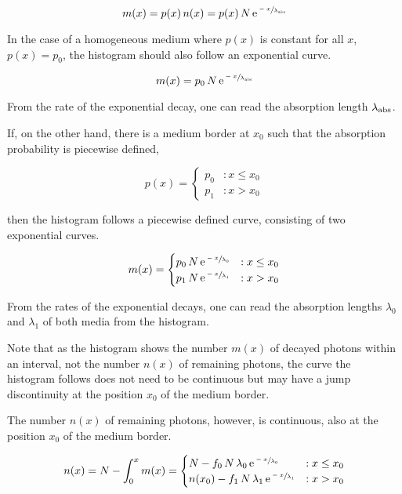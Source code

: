\[
  m(x) = p(x)\,n(x) = p(x)\,N\,\mathrm{e}^{\sfrac{-x}{\lambda_\text{abs}}}
\]

In the case of a homogeneous medium where \(p(x)\) is constant for all
\(x\), \(p(x) = p_0\), the histogram should also follow an exponential
curve.

\[
  m(x) = p_0\,N\,\mathrm{e}^{\sfrac{-x}{\lambda_\text{abs}}}
\]

From the rate of the exponential decay, one can read the absorption
length \(\lambda_\text{abs}\).

If, on the other hand, there is a medium border at \(x_0\) such that the
absorption probability is piecewise defined,

\[
  p(x) = \begin{cases}
    p_0 & : x \leq x_0 \\
    p_1 & : x > x_0
  \end{cases}
\]

then the histogram follows a piecewise defined curve, consisting of two
exponential curves.

\[
  m(x) = \begin{cases}
    p_0\,N\,\mathrm{e}^{\sfrac{-x}{\lambda_0}} & : x \leq x_0 \\
    p_1\,N\,\mathrm{e}^{\sfrac{-x}{\lambda_1}} & : x > x_0
  \end{cases}
\]

From the rates of the exponential decays, one can read the absorption
lengths \(\lambda_0\) and \(\lambda_1\) of both media from the
histogram.

Note that as the histogram shows the number \(m(x)\) of decayed photons
within an interval, not the number \(n(x)\) of remaining photons, the
curve the histogram follows does not need to be continuous but may have
a jump discontinuity at the position \(x_0\) of the medium border.

The number \(n(x)\) of remaining photons, however, is continuous, also
at the position \(x_0\) of the medium border.

\[
  n(x) = N - \int_0^x m(x) = \begin{cases}
    N - f_0\,N\,\lambda_0\,\mathrm{e}^{\sfrac{-x}{\lambda_0}} & : x \leq x_0 \\
    n(x_0) - f_1\,N\,\lambda_1\,\mathrm{e}^{\sfrac{-x}{\lambda_1}} & : x > x_0
  \end{cases}
\]
